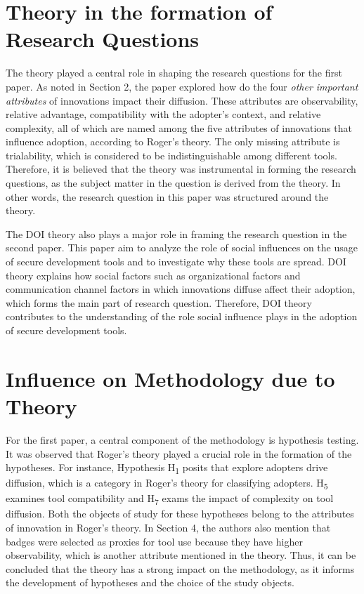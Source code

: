 \documentclass[journal,12pt,onecolumn,]{IEEEtran}
\begin{document}
\section{Theory in the formation of Research Questions}
The theory played a central role in shaping the research questions for the first paper. As noted in Section 2, the paper explored how do the four \textit{other important attributes} of innovations impact their diffusion.
 These attributes are observability, relative advantage, compatibility with the adopter's context, and relative complexity, all of which are named among the five attributes of innovations that influence adoption, according to Roger's theory. The only missing attribute is trialability, which is considered to be indistinguishable among different tools. 
 Therefore, it is believed that the theory was instrumental in forming the research questions, as the subject matter in the question is derived from the theory. In other words, the research question in this paper was structured around the theory.

The DOI theory also plays a major role in framing the research question in the second paper. This paper aim to analyze the role of social influences on the usage of secure development tools and to investigate why these tools are spread. DOI theory explains how social factors such as organizational factors and communication channel factors in which innovations diffuse affect their adoption, 
which forms the main part of research question. Therefore, DOI theory contributes to the understanding of the role social influence plays in the adoption of secure development tools. 
\section{Influence on Methodology due to Theory}
For the first paper, a central component of the methodology is hypothesis testing. It was observed that Roger's theory played a crucial role in the formation of the hypotheses.
For instance, Hypothesis H\textsubscript{1}  posits that explore adopters drive diffusion, which is a category in Roger's theory for classifying adopters.
H\textsubscript{5} examines tool compatibility and H\textsubscript{7} exams the impact of complexity on tool diffusion. Both the objects of study for these hypotheses belong to the attributes of innovation in Roger's theory. 
In Section 4, the authors also mention that badges were selected as proxies for tool use because they have higher observability, which is another attribute mentioned in the theory.
Thus, it can be concluded that the theory has a strong impact on the methodology, as it informs the development of hypotheses and the choice of the study objects.
\end{document}
